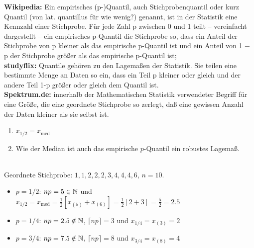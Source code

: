 \begin{kom}
    \textbf{Wikipedia:} Ein empirisches (p-)Quantil, auch Stichprobenquantil oder kurz Quantil (von lat. quantillus
    für wie wenig?) genannt, ist in der Statistik eine Kennzahl einer Stichprobe.
    Für jede Zahl p zwischen 0 und 1 teilt – vereinfacht dargestellt – ein empirisches p-Quantil die
    Stichprobe so, dass ein Anteil der Stichprobe von p kleiner als das empirische p-Quantil ist und ein Anteil von 1 −
    p der Stichprobe größer als das empirische p-Quantil ist; \\

    \textbf{studyflix:} Quantile gehören zu den Lagemaßen der Statistik.
    Sie teilen eine bestimmte Menge an Daten so ein, dass ein Teil p kleiner oder gleich und der andere Teil 1-p
    größer oder gleich dem Quantil ist. \\

    \textbf{Spektrum.de:} innerhalb der Mathematischen Statistik verwendeter Begriff für eine Größe, die eine
    geordnete Stichprobe so zerlegt, daß eine gewissen Anzahl der Daten kleiner als sie selbst ist.
\end{kom}

\begin{bem}
    \begin{enumerate}[label=(\alph*)]
        \item $x_{1/2} = x_{\mathrm{med}}$
        \item Wie der Median ist auch das empirische $p$-Quantil ein robustes \gls{Lagemaß}.
    \end{enumerate}
\end{bem}

\begin{bsp}
     \\
    Geordnete Stichprobe: $1,1,2,2,2,3,4,4,4,6$, $n=10$.
    \begin{itemize}
        \item $p=1/2$: $np=5\in\mathbb{N}$ und $x_{1/2}=x_{\mathrm{med}}=\frac12[x_{(5)}+x_{(6)}]=\frac12[2+3]=\frac52=2.5$
        \item $p=1/4$: $np=2.5\notin\mathbb{N}$, $\lceil np\rceil=3$ und $x_{1/4}=x_{(3)}=2$
        \item $p=3/4$: $np=7.5\notin\mathbb{N}$, $\lceil np\rceil=8$ und $x_{3/4}=x_{(8)}=4$
    \end{itemize}
\end{bsp}

